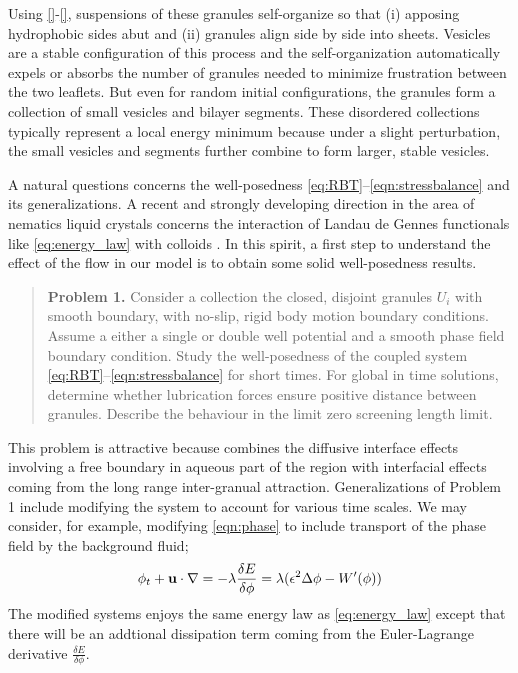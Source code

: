 Using \eqref{}-\eqref{}, suspensions of these granules self-organize
so that (i) apposing hydrophobic sides abut and (ii) granules align
side by side into sheets.  Vesicles are a stable configuration
of this process and the self-organization automatically expels or
absorbs the number of granules needed to minimize frustration between
the two leaflets.  But even for random initial configurations,
the granules form a collection of small vesicles and bilayer segments.
These disordered collections typically represent a local energy minimum 
because under a slight perturbation, the small vesicles and segments
further combine to form larger, stable vesicles.  

A natural questions concerns the well-posedness
\eqref{eq:RBT}--\eqref{eqn:stressbalance}
and its generalizations. A recent and strongly developing direction in
the area of nematics liquid crystals concerns the interaction of
Landau de Gennes functionals like \eqref{eq:energy_law} with colloids
\cite{doi:10.1098/rsta.2020.0432}.
In this spirit, a first step to understand the effect of the flow
in our model is to obtain some solid well-posedness results.

\begin{quotation}
  \textbf{Problem 1.} Consider a collection the closed,
  disjoint granules $U_i$ with smooth boundary,
with no-slip, rigid body motion boundary conditions.
Assume a either a single or double well potential
and a smooth phase field boundary condition.  
Study the well-posedness of the coupled system
\eqref{eq:RBT}--\eqref{eqn:stressbalance}
for short times.  For global in time solutions, determine
whether lubrication forces ensure positive distance
between granules.  Describe the behaviour in the limit
zero screening length limit.  
\end{quotation}

This problem is attractive because combines the diffusive interface
effects involving a free boundary in aqueous part of the region \cite{}
with interfacial effects coming from the long range inter-granual
attraction. Generalizations of Problem 1 include modifying the 
system to account for various time scales.
We may consider, for example, modifying \eqref{eqn:phase}
to include transport of the phase field by the background fluid;
\begin{equation*}
\phi_t + \mathbf{u} \cdot \nabla = -\lambda \frac{\delta E}{\delta \phi} = \lambda(\epsilon^2 \Delta \phi - W'(\phi))
\end{equation*}
The modified systems enjoys the same energy law as \eqref{eq:energy_law} 
except that there will be an addtional dissipation term coming from the
Euler-Lagrange derivative $\frac{\delta E}{\delta \phi}$.


